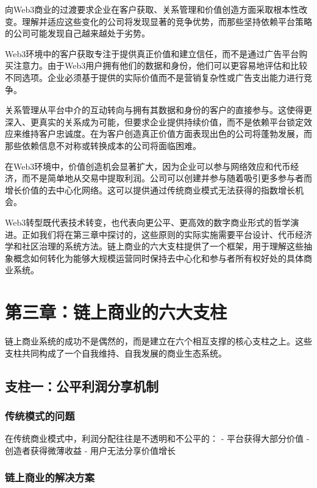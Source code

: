 \documentclass[
  Letterpaper,
]{scrbook}
\begin{document}
向Web3商业的过渡要求企业在客户获取、关系管理和价值创造方面采取根本性改变。理解并适应这些变化的公司将发现显著的竞争优势，而那些坚持依赖平台策略的公司可能发现自己越来越处于劣势。

Web3环境中的客户获取专注于提供真正价值和建立信任，而不是通过广告平台购买注意力。由于Web3用户拥有他们的数据和身份，他们可以更容易地评估和比较不同选项。企业必须基于提供的实际价值而不是营销复杂性或广告支出能力进行竞争。

关系管理从平台中介的互动转向与拥有其数据和身份的客户的直接参与。这使得更深入、更真实的关系成为可能，但要求企业提供持续价值，而不是依赖平台锁定效应来维持客户忠诚度。在为客户创造真正价值方面表现出色的公司将蓬勃发展，而那些依赖信息不对称或转换成本的公司将面临困难。

在Web3环境中，价值创造机会显著扩大，因为企业可以参与网络效应和代币经济，而不是简单地从交易中提取利润。公司可以创建并参与随着吸引更多参与者而增长价值的去中心化网络。这可以提供通过传统商业模式无法获得的指数增长机会。

Web3转型既代表技术转变，也代表向更公平、更高效的数字商业形式的哲学演进。正如我们将在第三章中探讨的，这些原则的实际实施需要平台设计、代币经济学和社区治理的系统方法。链上商业的六大支柱提供了一个框架，用于理解这些抽象概念如何转化为能够大规模运营同时保持去中心化和参与者所有权好处的具体商业系统。

\chapter{第三章：链上商业的六大支柱}\label{sec-six-pillars}

链上商业系统的成功不是偶然的，而是建立在六个相互支撑的核心支柱之上。这些支柱共同构成了一个自我维持、自我发展的商业生态系统。

\section{支柱一：公平利润分享机制}\label{ux652fux67f1ux4e00ux516cux5e73ux5229ux6da6ux5206ux4eabux673aux5236}

\subsection{传统模式的问题}\label{ux4f20ux7edfux6a21ux5f0fux7684ux95eeux9898}

在传统商业模式中，利润分配往往是不透明和不公平的： - 平台获得大部分价值
- 创造者获得微薄收益 - 用户无法分享价值增长

\subsection{链上商业的解决方案}\label{ux94feux4e0aux5546ux4e1aux7684ux89e3ux51b3ux65b9ux6848}
\end{document}
